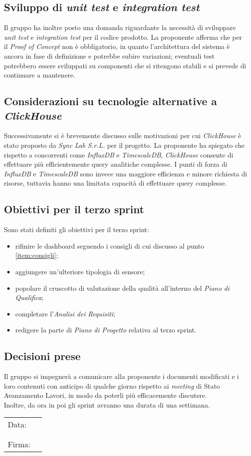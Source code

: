 \documentclass[italian,12pt]{article}
\begin{document}
\newpage
\subsection{Sviluppo di \textit{unit test} e \textit{integration test}}
Il gruppo ha inoltre posto una domanda riguardante la necessità di sviluppare \textit{unit test} e \textit{integration test} per il codice prodotto.
La proponente afferma che per il \textit{Proof of Concept} non è obbligatorio, in quanto l'architettura del sistema è ancora in fase di definizione
e potrebbe subire variazioni; eventuali test potrebbero essere sviluppati su componenti che si ritengono stabili e si prevede di continuare a mantenere.

\subsection{Considerazioni su tecnologie alternative a \textit{ClickHouse}}
Successivamente si è brevemente discusso sulle motivazioni per cui \textit{ClickHouse} è stato proposto da \textit{Sync Lab S.r.L.} per il progetto. La proponente ha spiegato che
rispetto a concorrenti come \textit{InfluxDB} e \textit{TimescaleDB}, \textit{ClickHouse}
consente di effettuare più efficientemente query analitiche complesse.
I punti di forza di \textit{InfluxDB} e \textit{TimescaleDB} sono invece una maggiore efficienza e minore richiesta di risorse, tuttavia
hanno una limitata capacità di effettuare query complesse.

\subsection{Obiettivi per il terzo sprint}
Sono stati definiti gli obiettivi per il terzo sprint:
\begin{itemize}
	\item rifinire le dashboard seguendo i consigli di cui discusso al punto \ref{item:consigli};
	\item aggiungere un'ulteriore tipologia di sensore;
	\item popolare il cruscotto di valutazione della qualità all'interno del \textit{Piano di Qualifica};
	\item completare l'\textit{Analisi dei Requisiti};
	\item redigere la parte di \textit{Piano di Progetto} relativa al terzo sprint.
\end{itemize}

\subsection{Decisioni prese}
Il gruppo si impegnerà a comunicare alla proponente i documenti modificati e i loro contenuti con anticipo di qualche giorno rispetto ai \textit{meeting}
di Stato Avanzamento Lavori, in modo da poterli più efficacemente discutere.\\
Inoltre, da ora in poi gli sprint avranno una durata di una settimana.

\newpage
\begin{table}[b]
	\begin{tabular}{@{}p{.5in}p{4in}@{}}
		Data:  & \hrulefill \\
		       &            \\
		       &            \\
		Firma: & \hrulefill \\
	\end{tabular}
\end{table}
\end{document}
